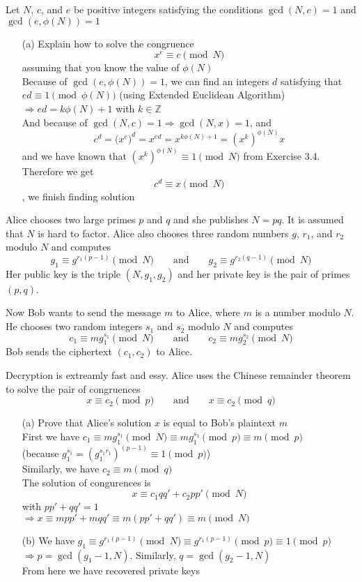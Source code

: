 \begin{exer}[3.6] Let $N$, $c$, and $e$ be positive integers satisfying the conditions $\gcd(N,c)=1$ and $\gcd(e,\phi(N))=1$
	\begin{enumerate}
		\item [(a)] Explain how to solve the congruence \[x^e \equiv c \pmod{N}\] assuming that you know the value of $\phi(N)$ \\ Because of $\gcd(e, \phi(N)) = 1$, we can find an integers $d$ satisfying that $ed \equiv 1 \pmod{\phi(N)}$ (using Extended Euclidean Algorithm) \\ $\Rightarrow ed = k\phi(N) + 1$ with $k \in \mathbb{Z}$ \\ And because of $\gcd(N, c)=1 \Rightarrow \gcd(N,x)=1$, and \[c^d = \Big(x^e\Big)^d = x^{ed} = x^{k\phi(N) + 1} = (x^k)^{\phi(N)}x\] and we have known that $(x^k)^{\phi(N)} \equiv 1 \pmod{N}$ from Exercise 3.4. Therefore we get \[c^d \equiv x \pmod{N}\], we finish finding solution
	\end{enumerate}
\end{exer}

\begin{exer}[3.11] Alice chooses two large primes $p$ and $q$ and she publishes $N=pq$. It is assumed that $N$ is hard to factor. Alice also chooses three random numbers $g$, $r_1$, and $r_2$ modulo $N$ and computes $$g_1 \equiv g^{r_1(p-1)} \pmod{N} \qquad \text{and} \qquad g_2 \equiv g^{r_2(q-1)} \pmod{N}$$ Her public key is the triple $(N, g_1, g_2)$ and her private key is the pair of primes $(p, q)$.
	
	Now Bob wants to send the message $m$ to Alice, where $m$ is a number modulo $N$. He chooses two random integers $s_1$ and $s_2$ modulo $N$ and computes $$c_1 \equiv mg_1^{s_1} \pmod{N} \qquad \text{and} \qquad c_2 \equiv mg_2^{s_2} \pmod{N}$$ Bob sends the ciphertext $(c_1, c_2)$ to Alice.
	
	Decryption is extreamly fast and essy. Alice uses the Chinese remainder theorem to solve the pair of congruences \[x \equiv c_2 \pmod{p} \qquad \text{and} \qquad x \equiv c_2 \pmod{q}\]
	\begin{enumerate}
		\item [(a)] Prove that Alice's solution $x$ is equal to Bob's plaintext $m$ \\ First we have $c_1 \equiv mg_1^{s_1} \pmod{N} \equiv mg_1^{s_1} \pmod{p} \equiv m \pmod{p}$ \\ (because $g_1^{s_1} = (g_1^{s_1 r_1})^{(p-1)} \equiv 1 \pmod{p}$) \\ Similarly, we have $c_2 \equiv m \pmod{q}$ \\ The solution of congurences is \[x \equiv c_1 q q' + c_2 p p' \pmod N\] with $p p' + q q' = 1$ \\ $\Rightarrow x \equiv m p p' + m q q' \equiv m(p p' + q q') \equiv m \pmod N$
		\item [(b)] We have $g_1 \equiv g^{r_1 (p-1)} \pmod N \equiv g^{r_1 (p-1)} \pmod p \equiv 1 \pmod p$ \\ $\Rightarrow p = \gcd(g_1-1, N)$. Similarly, $q = \gcd(g_2-1, N)$ \\ From here we have recovered private keys
	\end{enumerate}
\end{exer}